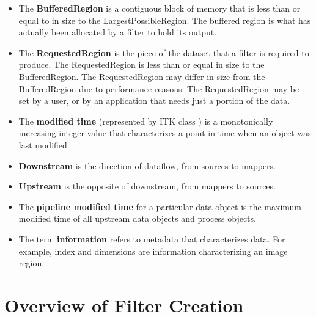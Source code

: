 \begin{itemize}
        \item The \textbf{BufferedRegion} is a contiguous block of memory
        that is less than or equal to in size to the
        LargestPossibleRegion. The buffered region is what has actually been
        allocated by a filter to hold its output.

        \item The \textbf{RequestedRegion} is the piece of the dataset that a
        filter is required to produce. The RequestedRegion is less than or
        equal in size to the BufferedRegion. The RequestedRegion may differ
        in size from the BufferedRegion due to performance reasons. The
        RequestedRegion may be set by a user, or by an application that needs
        just a portion of the data.

        \item The \textbf{modified time} (represented by ITK class
        ) is a monotonically increasing integer value that
        characterizes a point in time when an object was last modified.

        \item \textbf{Downstream} is the direction of dataflow, from sources
        to mappers.

        \item \textbf{Upstream} is the opposite of downstream, from mappers
        to sources.

        \item The \textbf{pipeline modified time} for a particular data
        object is the maximum modified time of all upstream data objects and
        process objects.

        \item The term \textbf{information} refers to metadata that
        characterizes data. For example, index and dimensions are information
        characterizing an image region.
\end{itemize}

\section{Overview of Filter Creation}
\label{sec:OverviewFilterCreation}

